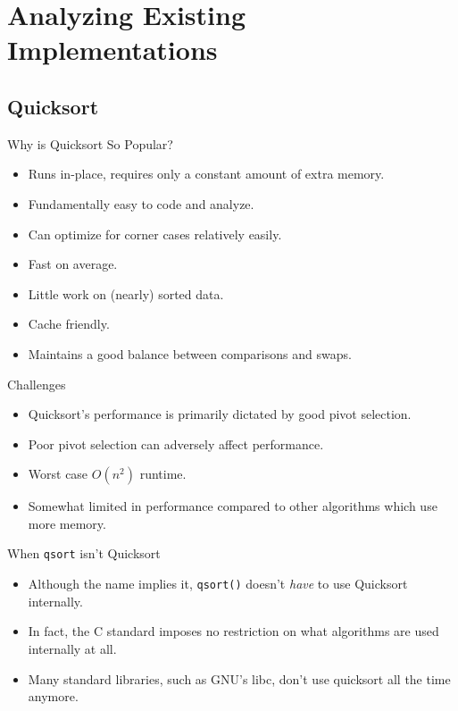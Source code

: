 \documentclass[13pt]{beamer}
\begin{document}
\section{Analyzing Existing Implementations}
\subsection{Quicksort}
\begin{frame}{Why is Quicksort So Popular?}
	\begin{itemize}
		\item\pause Runs in-place, requires only a constant amount of extra memory.
		\item\pause Fundamentally easy to code and analyze.
		\item\pause Can optimize for corner cases relatively easily.
		\item\pause Fast on average.
		\item\pause Little work on (nearly) sorted data.
		\item\pause Cache friendly.
		\item\pause Maintains a good balance between comparisons and swaps.
	\end{itemize}
\end{frame}

\begin{frame}{Challenges}
	\begin{itemize}
		\item\pause Quicksort's performance is primarily dictated by good
		pivot selection.
		\item\pause Poor pivot selection can adversely affect performance.
		\item\pause Worst case $O(n^{2})$ runtime.
		\item\pause Somewhat limited in performance compared to other algorithms
		which use more memory.
	\end{itemize}
\end{frame}

\begin{frame}{When \texttt{qsort} isn't Quicksort}
	\begin{itemize}
		\item\pause Although the name implies it, \texttt{qsort()} doesn't
		\textit{have} to use Quicksort internally.
		\item\pause In fact, the C standard imposes no restriction on what
		algorithms are used internally at all.
		\item\pause Many standard libraries, such as GNU's libc, don't use quicksort
		all the time anymore.
	\end{itemize}
\end{frame}
\end{document}
